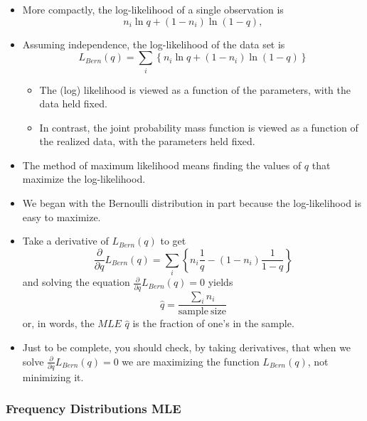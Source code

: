 \documentclass[]{book}
\begin{document}
\begin{itemize}
\item
  More compactly, the log-likelihood of a single observation is
  \[n_i \ln q + (1-n_i)\ln ( 1-q ) ,\]
\item
  Assuming independence, the log-likelihood of the data set is
  \[L_{Bern}(q)=\sum_i \left\{ n_i \ln q + (1-n_i)\ln ( 1-q ) \right\}\]

  \begin{itemize}
  \item
    The (log) likelihood is viewed as a function of the parameters, with
    the data held fixed.
  \item
    In contrast, the joint probability mass function is viewed as a
    function of the realized data, with the parameters held fixed.
  \end{itemize}
\item
  The method of maximum likelihood means finding the values of \(q\)
  that maximize the log-likelihood.
\item
  We began with the Bernoulli distribution in part because the
  log-likelihood is easy to maximize.
\item
  Take a derivative of \(L_{Bern}(q)\) to get
  \[\frac{\partial}{\partial q} L_{Bern}(q)=\sum_i \left\{ n_i \frac{1}{q} - (1-n_i)\frac{1}{1-q} \right\}\]
  and solving the equation
  \(\frac{\partial}{\partial q} L_{Bern}(q) =0\) yields
  \[\hat{q} = \frac{\sum_i n_i}{\mathrm{sample ~size}}\] or, in words,
  the \(MLE\) \(\hat{q}\) is the fraction of one's in the sample.
\item
  Just to be complete, you should check, by taking derivatives, that
  when we solve \(\frac{\partial}{\partial q} L_{Bern}(q) =0\) we are
  maximizing the function \(L_{Bern}(q)\), not minimizing it.
\end{itemize}

\subsubsection{Frequency Distributions
MLE}\label{frequency-distributions-mle}
\end{document}
